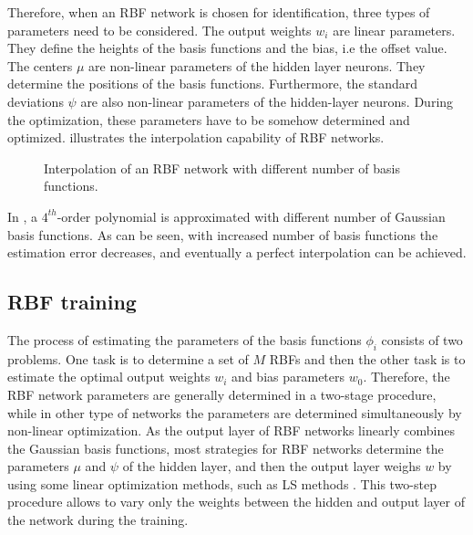 \vspace{-3mm}

Therefore, when an RBF network is chosen for identification, three types of parameters need to be considered. The output weights $w_i$ are linear parameters. They define the heights of the basis functions and the bias, i.e the offset value. The centers $\mu$ are non-linear parameters of the hidden layer neurons. They determine the positions of the basis functions. Furthermore, the standard deviations $\psi$ are also non-linear parameters of the hidden-layer neurons. During the optimization, these parameters have to be somehow determined and optimized.  illustrates the interpolation capability of RBF networks. 

\begin{figure}[H]
\centering
 
\caption{Interpolation of an RBF network with different number of basis functions.}
\label{fig:rbf_interpol}
\end{figure}

\vspace{-3mm}

In , a $4^{th}$-order polynomial is approximated with different number of Gaussian basis functions. As can be seen, with increased number of basis functions the estimation error decreases, and eventually a perfect interpolation can be achieved. 

\subsection{RBF training}
\label{RBF_training}

The process of estimating the parameters of the basis functions $\phi_i$ consists of two problems. One task is to determine a set of $M$ RBFs and then the other task is to estimate the optimal output weights $w_i$ and bias parameters $w_0$. Therefore, the RBF network parameters are generally determined in a two-stage procedure, while in other type of networks the parameters are determined simultaneously by non-linear optimization\cite{RBF_article}. As the output layer of RBF networks linearly combines the Gaussian basis functions, most strategies for RBF networks determine the parameters $\mu$ and $\psi$ of the hidden layer, and then the output layer weighs $w$ by using some linear optimization methods, such as LS methods \cite{nelles2013nonlinear}. This two-step procedure allows to vary only the weights between the hidden and output layer of the network during the training. 

